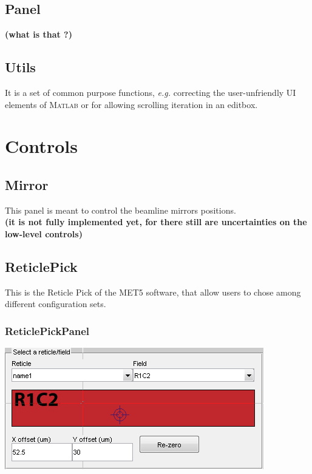 \documentclass[10pt,letter,twoside]{report}
\newcommand{\temp}[1] {{\bf (#1)}}
\begin{document}
\subsection{Panel}
\temp{what is that ?}
\subsection{Utils}
It is a set of common purpose functions, \textit{e.g.} correcting the user-unfriendly UI elements of \textsc{Matlab} or for allowing scrolling iteration in an editbox.

\section{Controls}
\subsection{Mirror}
This panel is meant to control the beamline mirrors positions.\\
\temp{it is not fully implemented yet, for there still are uncertainties on the low-level controls}

\subsection{ReticlePick}
This is the Reticle Pick of the MET5 software, that allow users to chose among different configuration sets.\\
\subsubsection{ReticlePickPanel}
\includegraphics[scale=0.5]{img/met5gui-ReticlePick.png}
\end{document}
